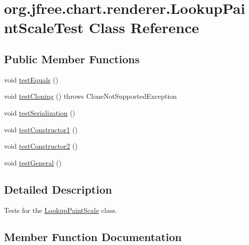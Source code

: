 \hypertarget{classorg_1_1jfree_1_1chart_1_1renderer_1_1_lookup_paint_scale_test}{}\section{org.\+jfree.\+chart.\+renderer.\+Lookup\+Paint\+Scale\+Test Class Reference}
\label{classorg_1_1jfree_1_1chart_1_1renderer_1_1_lookup_paint_scale_test}
\subsection*{Public Member Functions}
\begin{DoxyCompactItemize}
\item 
void \mbox{\hyperlink{classorg_1_1jfree_1_1chart_1_1renderer_1_1_lookup_paint_scale_test_a2d1ac23d472c8a12e81ec1675ab18085}{test\+Equals}} ()
\item 
void \mbox{\hyperlink{classorg_1_1jfree_1_1chart_1_1renderer_1_1_lookup_paint_scale_test_af471d198e4d5c8a62a0c050d7c30c58b}{test\+Cloning}} ()  throws Clone\+Not\+Supported\+Exception 
\item 
void \mbox{\hyperlink{classorg_1_1jfree_1_1chart_1_1renderer_1_1_lookup_paint_scale_test_a2824aa9372f4ae67764cea796e5ab668}{test\+Serialization}} ()
\item 
void \mbox{\hyperlink{classorg_1_1jfree_1_1chart_1_1renderer_1_1_lookup_paint_scale_test_a1595fdee1a89681d1cce829f8c26683a}{test\+Constructor1}} ()
\item 
void \mbox{\hyperlink{classorg_1_1jfree_1_1chart_1_1renderer_1_1_lookup_paint_scale_test_abac67458e8cb91d92b80e2886e4c67d4}{test\+Constructor2}} ()
\item 
void \mbox{\hyperlink{classorg_1_1jfree_1_1chart_1_1renderer_1_1_lookup_paint_scale_test_ab985ae5a6b94af58956748268c44d936}{test\+General}} ()
\end{DoxyCompactItemize}


\subsection{Detailed Description}
Tests for the \mbox{\hyperlink{classorg_1_1jfree_1_1chart_1_1renderer_1_1_lookup_paint_scale}{Lookup\+Paint\+Scale}} class. 

\subsection{Member Function Documentation}
\mbox{\label{classorg_1_1jfree_1_1chart_1_1renderer_1_1_lookup_paint_scale_test_af471d198e4d5c8a62a0c050d7c30c58b}} 

